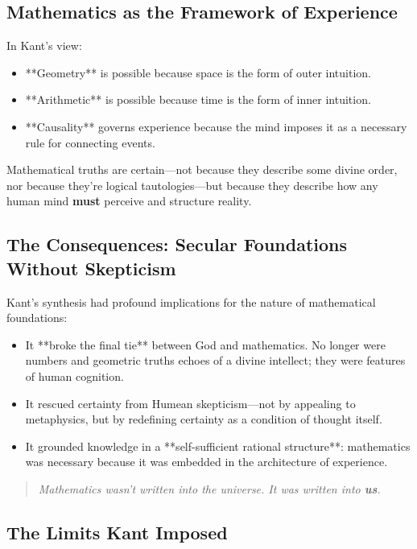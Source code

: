 \subsection*{Mathematics as the Framework of Experience}

In Kant’s view:

\begin{itemize}
    \item **Geometry** is possible because space is the form of outer intuition.
    \item **Arithmetic** is possible because time is the form of inner intuition.
    \item **Causality** governs experience because the mind imposes it as a necessary rule for connecting events.
\end{itemize}

Mathematical truths are certain—not because they describe some divine order, nor because they’re logical tautologies—but because they describe how any human mind \textbf{must} perceive and structure reality.

\subsection*{The Consequences: Secular Foundations Without Skepticism}

Kant’s synthesis had profound implications for the nature of mathematical foundations:

\begin{itemize}
    \item It **broke the final tie** between God and mathematics. No longer were numbers and geometric truths echoes of a divine intellect; they were features of human cognition.
    \item It rescued certainty from Humean skepticism—not by appealing to metaphysics, but by redefining certainty as a condition of thought itself.
    \item It grounded knowledge in a **self-sufficient rational structure**: mathematics was necessary because it was embedded in the architecture of experience.
\end{itemize}

\begin{quote}
\textit{Mathematics wasn’t written into the universe.  
It was written into \textbf{us}.}
\end{quote}

\subsection*{The Limits Kant Imposed}

